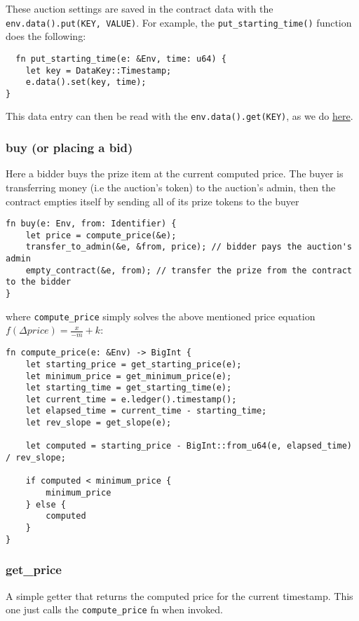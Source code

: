 \documentclass[10pt]{article}
\begin{document}
These auction settings are saved in the contract data with the \texttt{env.data().put(KEY, VALUE)}. For example, the \texttt{put\_starting\_time()} function does the following:

\begin{verbatim}
  fn put_starting_time(e: &Env, time: u64) {
    let key = DataKey::Timestamp;
    e.data().set(key, time);
}
\end{verbatim}

This data entry can then be read with the \texttt{env.data().get(KEY)}, as we do \href{https://github.com/Xycloo/soroban-dutch-auction-contract/blob/main/src/lib.rs#L77}{here}.

\subsubsection*{buy (or placing a bid)}
Here a bidder buys the prize item at the current computed price. The buyer is transferring money (i.e the auction's token) to the auction's admin, then the contract empties itself by sending all of its prize tokens to the buyer

\begin{verbatim}
fn buy(e: Env, from: Identifier) {
    let price = compute_price(&e);
    transfer_to_admin(&e, &from, price); // bidder pays the auction's admin
    empty_contract(&e, from); // transfer the prize from the contract to the bidder
}
\end{verbatim}

where \texttt{compute\_price} simply solves the above mentioned price equation $f(\Delta price) = \frac{x}{-m} + k$:

\begin{verbatim}
fn compute_price(e: &Env) -> BigInt {
    let starting_price = get_starting_price(e);
    let minimum_price = get_minimum_price(e);
    let starting_time = get_starting_time(e);
    let current_time = e.ledger().timestamp();
    let elapsed_time = current_time - starting_time;
    let rev_slope = get_slope(e);

    let computed = starting_price - BigInt::from_u64(e, elapsed_time) / rev_slope;

    if computed < minimum_price {
        minimum_price
    } else {
        computed
    }
}
\end{verbatim}

\subsubsection*{get\_price}
A simple getter that returns the computed price for the current timestamp. This one just calls the \texttt{compute\_price} fn when invoked.
\end{document}
